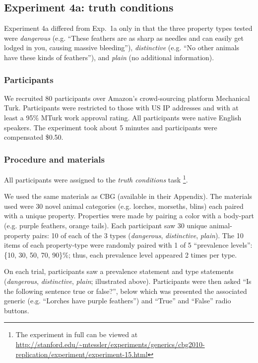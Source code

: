 \documentclass[10pt,letterpaper]{article}
\begin{document}
\subsection{Experiment 4a: truth conditions}

Experiment 4a differed from Exp.~1a only in that the three property types tested were \emph{dangerous} (e.g. ``These feathers are as sharp as needles and can easily get lodged in you, causing massive bleeding''),  \emph{distinctive} (e.g. ``No other animals have these kinds of feathers''), and \emph{plain} (no additional information). 

\subsubsection{Participants}

We recruited 80 participants over Amazon's crowd-sourcing platform Mechanical Turk. Participants were restricted to those with US IP addresses and with at least a 95\% MTurk work approval rating. All participants were native English speakers. The experiment took about 5 minutes and participants were compensated \$0.50.

\subsubsection{Procedure and materials}

All participants were assigned to the \emph{truth conditions} task \footnote{The experiment in full can be viewed at \url{http://stanford.edu/~mtessler/experiments/generics/cbg2010-replication/experiment/experiment-15.html}}. 
 
We used the same materials as CBG (available in their Appendix). The materials used were 30 novel animal categories (e.g. lorches, morseths, blins) each paired with a unique property. Properties were made by pairing a color with a body-part (e.g. purple feathers, orange tails). Each participant saw 30 unique animal-property pairs: 10 of each of the 3 types (\emph{dangerous}, \emph{distinctive}, \emph{plain}). The 10 items of each property-type were randomly paired with 1 of 5 ``prevalence levels'': \{10, 30, 50, 70, 90\}\%; thus, each prevalence level appeared 2 times per type. 

On each trial, participants saw a prevalence statement and type statements (\emph{dangerous}, \emph{distinctive}, \emph{plain}; illustrated above). 
Participants were then asked ``Is the following sentence true or false?'', below which was presented the associated generic (e.g. ``Lorches have purple feathers'') and ``True'' and ``False'' radio buttons. 
 
\end{document}
